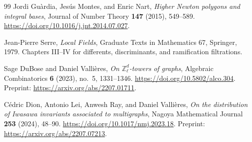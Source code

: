 \begin{thebibliography}{99}
Jordi Gu\`ardia, Jes\'us Montes, and Enric Nart,
\emph{Higher Newton polygons and integral bases},
Journal of Number Theory \textbf{147} (2015), 549--589.
\url{https://doi.org/10.1016/j.jnt.2014.07.027}.

Jean-Pierre Serre, \emph{Local Fields},
Graduate Texts in Mathematics 67, Springer, 1979.
Chapters III--IV for differents, discriminants, and ramification filtrations.

Sage DuBose and Daniel Valli\`eres,
\emph{On $\mathbb Z_\ell^d$-towers of graphs},
Algebraic Combinatorics \textbf{6} (2023), no.~5, 1331--1346.
\url{https://doi.org/10.5802/alco.304}.
Preprint: \url{https://arxiv.org/abs/2207.01711}.

C\'edric Dion, Antonio Lei, Anwesh Ray, and Daniel Valli\`eres,
\emph{On the distribution of Iwasawa invariants associated to multigraphs},
Nagoya Mathematical Journal \textbf{253} (2024), 48--90.
\url{https://doi.org/10.1017/nmj.2023.18}.
Preprint: \url{https://arxiv.org/abs/2207.07213}.
\end{thebibliography}
